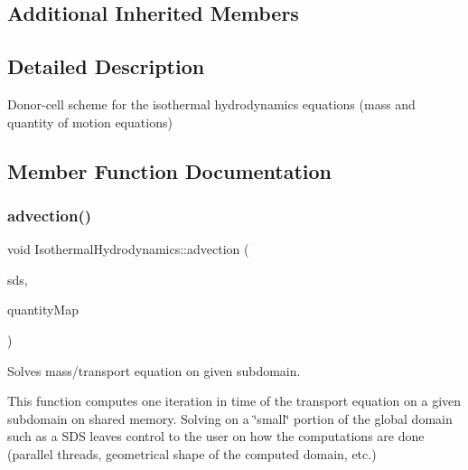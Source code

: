 \subsection*{Additional Inherited Members}


\subsection{Detailed Description}
Donor-\/cell scheme for the isothermal hydrodynamics equations (mass and quantity of motion equations) 

\subsection{Member Function Documentation}
\mbox{\label{classIsothermalHydrodynamics_a735f87131064a760670eb884743d513f}} 
\subsubsection{\texorpdfstring{advection()}{advection()}}
{\footnotesize\ttfamily void Isothermal\+Hydrodynamics\+::advection (\begin{DoxyParamCaption}\item[{const \hyperlink{classSDShared}{S\+D\+Shared} \&}]{sds,  }\item[{std\+::map$<$ std\+::string, \hyperlink{classQuantity}{Quantity}$<$ real $>$ $\ast$ $>$}]{quantity\+Map }\end{DoxyParamCaption})}



Solves mass/transport equation on given subdomain. 

This function computes one iteration in time of the transport equation on a given subdomain on shared memory. Solving on a \char`\"{}small\char`\"{} portion of the global domain such as a S\+DS leaves control to the user on how the computations are done (parallel threads, geometrical shape of the computed domain, etc.) \mbox{\label{classIsothermalHydrodynamics_a58488558d3ca76d8f2ee50ad73f3a99f}} 
